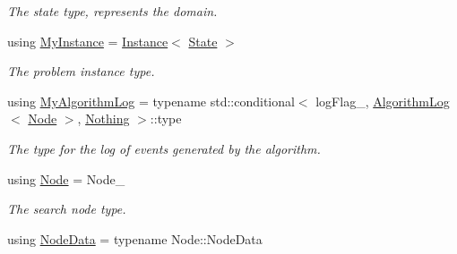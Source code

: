 \begin{DoxyCompactItemize}
\begin{DoxyCompactList}\small\item\em The state type, represents the domain. \end{DoxyCompactList}\item 
using \hyperlink{structalgorithm_1_1BaseTraits_a38163af455fcd59619d980365d56a63f}{My\+Instance} = \hyperlink{structInstance}{Instance}$<$ \hyperlink{structalgorithm_1_1BaseTraits_aa61b1003453764d9ca52cb1087526ba4}{State} $>$\hypertarget{structalgorithm_1_1BaseTraits_a38163af455fcd59619d980365d56a63f}{}\label{structalgorithm_1_1BaseTraits_a38163af455fcd59619d980365d56a63f}

\begin{DoxyCompactList}\small\item\em The problem instance type. \end{DoxyCompactList}\item 
using \hyperlink{structalgorithm_1_1BaseTraits_a4cfe4deab94cc6c473b0b20dfbce66fd}{My\+Algorithm\+Log} = typename std\+::conditional$<$ log\+Flag\+\_\+, \hyperlink{structAlgorithmLog}{Algorithm\+Log}$<$ \hyperlink{structalgorithm_1_1BaseTraits_a95cf86d8632b01d605a17c5044d06873}{Node} $>$, \hyperlink{structNothing}{Nothing} $>$\+::type\hypertarget{structalgorithm_1_1BaseTraits_a4cfe4deab94cc6c473b0b20dfbce66fd}{}\label{structalgorithm_1_1BaseTraits_a4cfe4deab94cc6c473b0b20dfbce66fd}

\begin{DoxyCompactList}\small\item\em The type for the log of events generated by the algorithm. \end{DoxyCompactList}\item 
using \hyperlink{structalgorithm_1_1BaseTraits_a95cf86d8632b01d605a17c5044d06873}{Node} = Node\+\_\+\hypertarget{structalgorithm_1_1BaseTraits_a95cf86d8632b01d605a17c5044d06873}{}\label{structalgorithm_1_1BaseTraits_a95cf86d8632b01d605a17c5044d06873}

\begin{DoxyCompactList}\small\item\em The search node type. \end{DoxyCompactList}\item 
using \hyperlink{structalgorithm_1_1BaseTraits_a05b654af4d6bd35af9e72d36a12d904f}{Node\+Data} = typename Node\+::\+Node\+Data\hypertarget{structalgorithm_1_1BaseTraits_a05b654af4d6bd35af9e72d36a12d904f}{}\label{structalgorithm_1_1BaseTraits_a05b654af4d6bd35af9e72d36a12d904f}


\end{DoxyCompactItemize}
